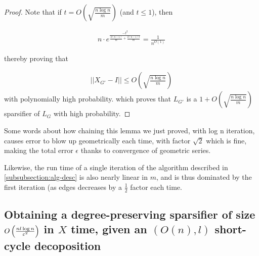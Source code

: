 \documentclass[12pt]{article}
\begin{document}
\begin{proof}

      Note that if $t = O\left(\sqrt{\frac{n \log n}{m}}\right)$ (and $t \leq 1$), then 

      \begin{align}
      n \cdot e^{\frac{-t^2}{\frac{2(n-1)}{m} + \frac{2(n-1)t}{m}}}
      = \frac{1}{n^{O(1)}} 
      \end{align}


    thereby proving that 
      
      \begin{align}
      ||X_{G'} - I|| \leq O\left(\sqrt{\frac{n\log n}{m}}\right)
      \end{align}
        with polynomially high probability.
      which proves that $L_{G'}$ is a $1 + O\left(\sqrt{\frac{n\log n}{m}}\right)$
      sparsifier of $L_G$ with
      high probability.
    \end{proof}
    Some words about how chaining this lemma we just proved, with log n
    iteration, causes error to blow up geometrically each time, with factor
    $\sqrt{2}$ which is fine, 
    making the total error $\epsilon$ thanks to convergence of geometric series.

    Likewise, the run time of a single iteration of the algorithm described in
    \ref{subsubsection:alg-desc} is also nearly linear in $m$, and is thus
    dominated by the first iteration (as edges decreases by a $\frac{1}{2}$
    factor each time.

    \subsection{Obtaining a degree-preserving sparsifier of size 
    $O\left(\frac{nl \log n}{\varepsilon^2}\right)$ in $X$ time, given an
    $(O(n), l)$ short-cycle decoposition}

\end{document}
